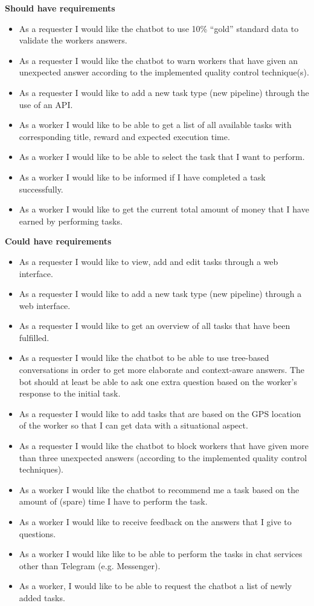 \documentclass[a4paper,dutch,fleqn]{exam}
\begin{document}
\textbf{Should have requirements} 
\begin{itemize} 
\itemsep0em 
\item As a requester I would like the chatbot to use 10\% “gold” standard data to validate the workers answers.
\item As a requester I would like the chatbot to warn workers that have given an unexpected answer according to the implemented quality control technique(s).
\item As a requester I would like to add a new task type (new pipeline) through the use of an API.
\item As a worker I would like to be able to get a list of all available tasks with corresponding title, reward and expected execution time.
\item As a worker I would like to be able to select the task that I want to perform.
\item As a worker I would like to be informed if I have completed a task successfully.
\item As a worker I would like to get the current total amount of money that I have earned by performing tasks. 
\end{itemize} 

\textbf{Could have requirements} 
\begin{itemize}
\itemsep0em 
\item As a requester I would like to view, add and edit tasks through a web interface.
\item As a requester I would like to add a new task type (new pipeline) through a web interface.
\item As a requester I would like to get an overview of all tasks that have been fulfilled. 
\item As a requester I would like the chatbot to be able to use tree-based conversations in order to get more elaborate and context-aware answers. The bot should at least be able to ask one extra question based on the worker's response to the initial task.
\item As a requester I would like to add tasks that are based on the GPS location of the worker so that I can get data with a situational aspect.
\item As a requester I would like the chatbot to block workers that have given more than three unexpected answers (according to the implemented quality control techniques).
\item As a worker I would like the chatbot to recommend me a task based on the amount of (spare) time I have to perform the task.
\item As a worker I would like to receive feedback on the answers that I give to questions.
\item As a worker I would like like to be able to perform the tasks in chat services other than Telegram (e.g. Messenger).
\item As a worker, I would like to be able to request the chatbot a list of newly added tasks.
\end{itemize} 
\end{document}
